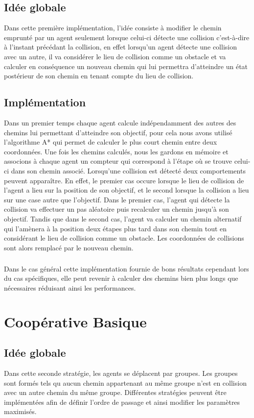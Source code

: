 \documentclass[a4paper, twocolumn]{article}
\begin{document}
			\subsection{Idée globale}
			Dans cette première implémentation, l'idée consiste à modifier le chemin emprunté par un agent seulement lorsque celui-ci détecte une collision c'est-à-dire à l'instant précédant la collision, en effet lorsqu'un agent détecte une collision avec un autre, il va considérer le lieu de collision comme un obstacle et va calculer en conséquence un nouveau chemin qui lui permettra d'atteindre un état postérieur de son chemin en tenant compte du lieu de collision.

			\subsection{Implémentation}
			Dans un premier temps chaque agent calcule indépendamment des autres des chemins lui permettant d'atteindre son objectif, pour cela nous avons utilisé l'algorithme A* qui permet de calculer le plus court chemin entre deux coordonnées.
			Une fois les chemins calculés, nous les gardons en mémoire et associons à chaque agent un compteur qui correspond à l'étape où se trouve celui-ci dans son chemin associé.
			Lorsqu'une collision est détecté deux comportements peuvent apparaître.
			En effet, le premier cas occure lorsque le lieu de collision de l'agent a lieu sur la position de son objectif, et le second lorsque la collision a lieu sur une case autre que l'objectif.
			Dans le premier cas, l'agent qui détecte la collision va effectuer un pas aléatoire puis recalculer un chemin jusqu'à son objectif. Tandis que dans le second cas, l'agent va calculer un chemin alternatif qui l'amènera à la position deux étapes plus tard dans son chemin tout en considérant le lieu de collision comme un obstacle. Les coordonnées de collisions sont alors remplacé par le nouveau chemin.
			
			\subparagraph{}
			Dans le cas général cette implémentation fournie de bons résultats cependant lors du cas spécifiques, elle peut revenir à calculer des chemins bien plus longs que nécessaires réduisant ainsi les performances.

		\section{Coopérative Basique}

			\subsection{Idée globale}
			Dans cette seconde stratégie, les agents se déplacent par groupes. Les groupes sont formés tels qu aucun chemin appartenant au même groupe n'est en collision avec un autre chemin du même groupe. Différentes stratégies peuvent être implémentées afin de définir l'ordre de passage et ainsi modifier les paramètres maximisés.
\end{document}
